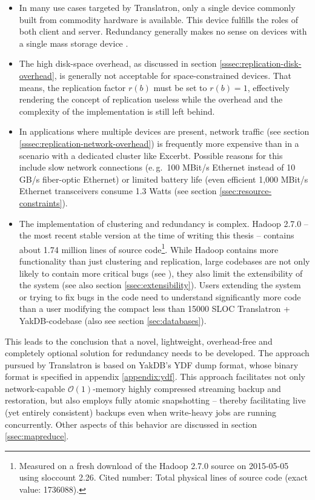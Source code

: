 \documentclass[a4paper, 12pt, twoside, reqn]{report}
\numberwithin{figure}{chapter}
\newtheorem[L]{boxedDefinition}{Definition}
\newtheorem[L]{boxedExample}{Example}
\newcommand{\eg}{e.\,g.\ }
\begin{document}
\begin{itemize}
 \item In many use cases targeted by Translatron, only a single device commonly built from commodity hardware is available. This device fulfills the roles of both client and server. Redundancy generally makes no sense on devices with a single mass storage device	.
 
 \item The high disk-space overhead, as discussed in section \ref{sssec:replication-disk-overhead}, is generally not acceptable for space-constrained devices. That means, the replication factor $r(b)$ must be set to $r(b) = 1$, effectively rendering the concept of replication useless while the overhead and the complexity of the implementation is still left behind.
 
 \item In applications where multiple devices are present, network traffic (see section \ref{sssec:replication-network-overhead}) is frequently more expensive than in a scenario with a dedicated cluster like Excerbt. Possible reasons for this include slow network connections (\eg 100 MBit/s Ethernet instead of 10 GB/s fiber-optic Ethernet) or limited battery life (even efficient 1,000 MBit/s Ethernet transceivers consume 1.3 Watts (see section \ref{ssec:resource-constraints}).
 
 \item The implementation of clustering and redundancy is complex. Hadoop 2.7.0 -- the most recent stable version at the time of writing this thesis -- contains about 1.74 million lines of source code\footnote{Measured on a fresh download of the Hadoop 2.7.0 source on 2015-05-05 using sloccount 2.26. Cited number: Total physical lines of source code (exact value: \num{1736088}).}. While Hadoop contains more functionality than just clustering and replication, large codebases are not only likely to contain more critical bugs (see \cite{gaffney1984estimating}), they also limit the extensibility of the system (see also section \ref{ssec:extensibility}). Users extending the system or trying to fix bugs in the code need to understand significantly more code than a user modifying the compact less than 15000 SLOC Translatron + YakDB-codebase (also see section \ref{sec:databases}).
\end{itemize}

This leads to the conclusion that a novel, lightweight, overhead-free and completely optional solution for redundancy needs to be developed. The approach pursued by Translatron is based on YakDB's YDF dump format, whose binary format is specified in appendix \ref{appendix:ydf}. This approach facilitates not only network-capable $\mathcal{O}(1)$-memory highly compressed streaming backup and restoration, but also employs fully atomic snapshotting -- thereby facilitating live (yet entirely consistent) backups even when write-heavy jobs are running concurrently. Other aspects of this behavior are discussed in section \ref{ssec:mapreduce}.
\end{document}

